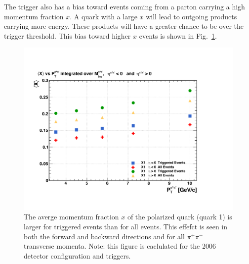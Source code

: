 \documentclass[letterpaper, abstract = on,listof=totoc, bibliography=totoc]{scrreprt}
\newcommand{\pip}{\pi^+}
\newcommand{\pim}{\pi^-}
\newcommand{\pair}{$\pip\pim$ }
\begin{document}
\begin{appendices}

The trigger also has a bias toward events coming from a parton carrying a high momentum fraction $x$. A quark with a large $x$ will lead to outgoing products carrying more energy. These products will have a greater chance to be over the trigger threshold. This bias toward higher $x$ events is shown in Fig.~\ref{fig:TriggerBiasXHiQualColor2012}. 

\begin{figure}
\begin{center}
\includegraphics[width = 1\textwidth]{TriggerBiasXHiQualColor}
\caption[Trigger bias toward higher momentum fraction $x$ events]{The averge momentum fraction $x$ of the polarized quark (quark 1) is larger for triggered events than for all events. This effefct is seen in both the forward and backward directions and for all \pair transverse momenta. Note: this figure is caclulated for the 2006 detector configuration and triggers.}
\label{fig:TriggerBiasXHiQualColor2012}
\end{center}
\end{figure}


\end{appendices}
\end{document}
